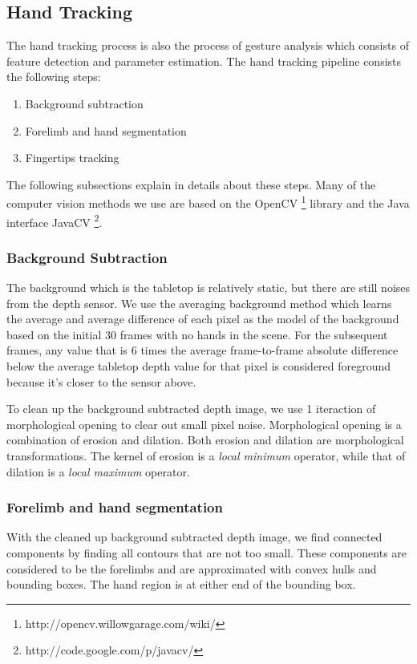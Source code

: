 \subsection{Hand Tracking}
The hand tracking process is also the process of gesture analysis which
consists of feature detection and parameter estimation. The hand tracking
pipeline consists the following steps:

\begin{enumerate}
  \item Background subtraction
  \item Forelimb and hand segmentation
  \item Fingertips tracking
\end{enumerate}

The following subsections explain in details about these steps. Many of the
computer vision methods we use are based on the OpenCV
\footnote{http://opencv.willowgarage.com/wiki/} library and the Java interface 
JavaCV \footnote{http://code.google.com/p/javacv/}.

\subsubsection{Background Subtraction}
The background which is the tabletop is relatively static, but there are still 
noises from the depth sensor. We use the averaging background method which
learns the average and average difference of each pixel as the model of the 
background based on the initial 30 frames with no hands in the scene. For the
subsequent frames, any value that is 6 times the average frame-to-frame absolute
difference below the average tabletop depth value for that pixel is considered 
foreground because it's closer to the sensor above.

To clean up the background subtracted depth image, we use 1 iteraction of
morphological opening to clear out small pixel noise. Morphological opening is a
combination of erosion and dilation. Both erosion and dilation are morphological
transformations. The kernel of erosion is a \textit{local minimum} operator,
while that of dilation is a \textit{local maximum} operator.

\subsubsection{Forelimb and hand segmentation}
With the cleaned up background subtracted depth image, we find connected
components by finding all contours that are not too small. These components are
considered to be the forelimbs and are approximated with convex hulls and 
bounding boxes. The hand region is at either end of the bounding box.

